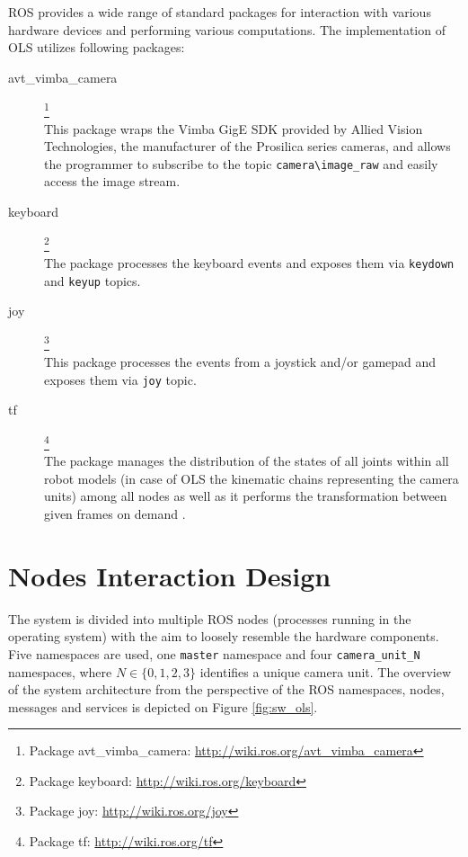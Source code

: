 ROS provides a wide range of standard packages for interaction with various hardware devices and performing various computations. The implementation of OLS utilizes following packages:

\begin{description}
	\item[avt\_vimba\_camera]\footnote{Package avt\_vimba\_camera: \url{http://wiki.ros.org/avt_vimba_camera}} \hfill \\
	This package wraps the Vimba GigE SDK provided by Allied Vision Technologies, the manufacturer of the Prosilica series cameras, and allows the programmer to subscribe to the topic \texttt{camera\textbackslash image\_raw} and easily access the image stream.
	
	\item[keyboard]\footnote{Package keyboard: \url{http://wiki.ros.org/keyboard}} \hfill \\
	The package processes the keyboard events and exposes them via \texttt{keydown} and \texttt{keyup} topics.
	
	\item[joy]\footnote{Package joy: \url{http://wiki.ros.org/joy}} \hfill \\
	This package processes the events from a joystick and/or gamepad and exposes them via \texttt{joy} topic.
	
	\item[tf]\footnote{Package tf: \url{http://wiki.ros.org/tf}} \hfill \\
	The package manages the distribution of the states of all joints within all robot models (in case of OLS the kinematic chains representing the camera units) among all nodes as well as it performs the transformation between given frames on demand \cite{tf}.
	
\end{description}
	

\section{Nodes Interaction Design}


The system is divided into multiple ROS nodes (processes running in the operating system) with the aim to loosely resemble the hardware components. Five namespaces are used, one \texttt{master} namespace and four \texttt{camera\_unit\_N} namespaces, where $N \in \{0, 1, 2, 3\}$ identifies a unique camera unit. The overview of the system architecture from the perspective of the ROS namespaces, nodes, messages and services is depicted on Figure \ref{fig:sw_ols}.

